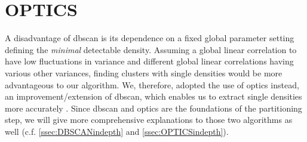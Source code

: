 \section{OPTICS}\label{sec:OPTICSintro}
A disadvantage of \gls{dbscan} is its dependence on a fixed global parameter setting defining the \textit{minimal} detectable density. Assuming a global linear correlation to have low fluctuations in variance and different global linear correlations having various other variances, finding clusters with single densities would be more advantageous to our algorithm. We, therefore, adopted the use of \gls{optics} instead, an improvement/extension of \gls{dbscan}, which enables us to extract single densities more accurately \cite{opticsankerst1999optics}. Since \gls{dbscan} and \gls{optics} are the foundations of the partitioning step, we will give more comprehensive explanations to those two algorithms as well (c.f. \autoref{ssec:DBSCANindepth} and \autoref{ssec:OPTICSindepth}).

    
